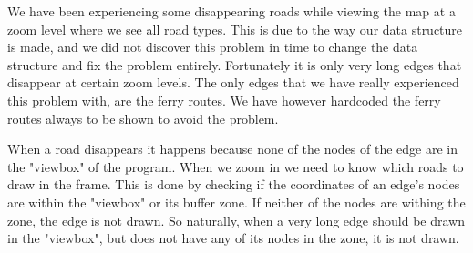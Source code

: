 We have been experiencing some disappearing roads while viewing the map at a zoom level where we see all road types. This is due to the way our data structure is made, and we did not discover this problem in time to change the data structure and fix the problem entirely. Fortunately it is only very long edges that disappear at certain zoom levels. The only edges that we have really experienced this problem with, are the ferry routes. We have however hardcoded the ferry routes always to be shown to avoid the problem.

When a road disappears it happens because none of the nodes of the edge are in the "viewbox" of the program. When we zoom in we need to know which roads to draw in the frame. This is done by checking if the coordinates of an edge's nodes are within the "viewbox" or its buffer zone. If neither of the nodes are withing the zone, the edge is not drawn. So naturally, when a very long edge should be drawn in the "viewbox", but does not have any of its nodes in the zone, it is not drawn. 
